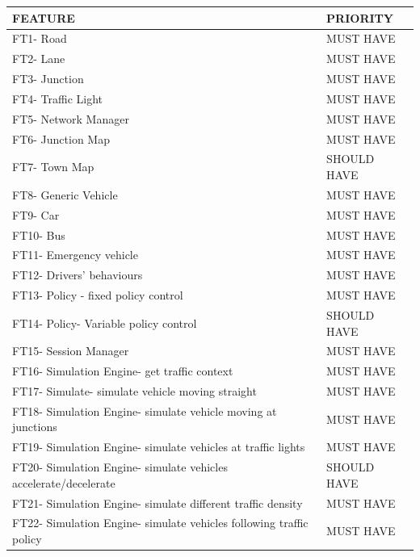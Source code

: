 \documentclass[11pt]{article}
\begin{document}
{\begin{itemize}
\begin{itemize}
      \begin{table}[H]
       
        \begin{tabular}{l|l}
             FEATURE & PRIORITY \\ \hline
             FT1- Road & MUST HAVE \\ \hline
             FT2- Lane & MUST HAVE \\ \hline
             FT3- Junction & MUST HAVE \\ \hline
             FT4- Traffic Light & MUST HAVE \\ \hline
             FT5- Network Manager & MUST HAVE \\ \hline
             FT6- Junction Map & MUST HAVE \\ \hline
             FT7- Town Map & SHOULD HAVE \\ \hline
             FT8- Generic Vehicle & MUST HAVE \\ \hline
             FT9- Car  & MUST HAVE \\ \hline
             FT10- Bus & MUST HAVE \\ \hline
             FT11- Emergency vehicle & MUST HAVE \\ \hline
             FT12- Drivers' behaviours & MUST HAVE \\ \hline
             FT13- Policy - fixed policy control  & MUST HAVE \\ \hline
             FT14- Policy- Variable policy control& SHOULD HAVE \\ \hline
             FT15- Session Manager  & MUST HAVE \\ \hline
             FT16- Simulation Engine- get traffic context & MUST HAVE \\ \hline
             FT17- Simulate- simulate vehicle moving straight & MUST HAVE \\ \hline
             FT18- Simulation Engine- simulate vehicle moving at junctions& MUST HAVE \\ \hline
             FT19- Simulation Engine- simulate vehicles at traffic lights & MUST HAVE \\ \hline
             FT20- Simulation Engine- simulate vehicles accelerate/decelerate & SHOULD HAVE \\ \hline
             FT21- Simulation Engine- simulate different traffic density & MUST HAVE \\ \hline
             FT22- Simulation Engine- simulate vehicles following traffic policy & MUST HAVE \\ \hline

\end{tabular}
\end{table}
\end{itemize}
\end{itemize}}
\end{document}
